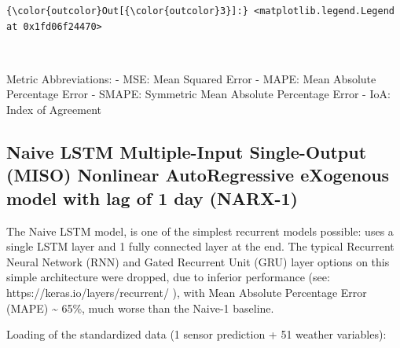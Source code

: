 \documentclass[11pt]{article}
\begin{document}
\begin{Verbatim}[commandchars=\\\{\}]
{\color{outcolor}Out[{\color{outcolor}3}]:} <matplotlib.legend.Legend at 0x1fd06f24470>
\end{Verbatim}
            
    \begin{center}
    \end{center}
    { \hspace*{\fill} \\}
    
    Metric Abbreviations: - MSE: Mean Squared Error - MAPE: Mean Absolute
Percentage Error - SMAPE: Symmetric Mean Absolute Percentage Error -
IoA: Index of Agreement

    \hypertarget{naive-lstm-multiple-input-single-output-miso-nonlinear-autoregressive-exogenous-model-with-lag-of-1-day-narx-1}{%
\subsection{Naive LSTM Multiple-Input Single-Output (MISO) Nonlinear
AutoRegressive eXogenous model with lag of 1 day
(NARX-1)}\label{naive-lstm-multiple-input-single-output-miso-nonlinear-autoregressive-exogenous-model-with-lag-of-1-day-narx-1}}

    The Naive LSTM model, is one of the simplest recurrent models possible:
uses a single LSTM layer and 1 fully connected layer at the end. The
typical Recurrent Neural Network (RNN) and Gated Recurrent Unit (GRU)
layer options on this simple architecture were dropped, due to inferior
performance (see: https://keras.io/layers/recurrent/ ), with Mean
Absolute Percentage Error (MAPE) \textasciitilde{} 65\%, much worse than
the Naive-1 baseline.

Loading of the standardized data (1 sensor prediction + 51 weather
variables):
\end{document}
